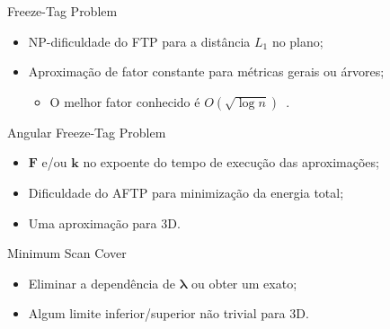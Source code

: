\subseqslide

\begin{frame}{Freeze-Tag Problem}
  \begin{itemize}[<+->]

    \item NP-dificuldade do FTP para a distância $L_1$ no plano;

    \item Aproximação de fator constante para métricas gerais ou árvores;

    \begin{itemize}[<+->]
        \item O melhor fator conhecido é $O(\sqrt{\log n})$~\cite{Kne05}.
    \end{itemize}

  \end{itemize}
\end{frame}

\begin{frame}{Angular Freeze-Tag Problem}
  \begin{itemize}[<+->]

    \item $\mathbf{F}$ e/ou $\mathbf{k}$ no expoente do tempo de execução das aproximações;

    \item Dificuldade do AFTP para minimização da energia total;

    \item Uma aproximação para 3D.

  \end{itemize}
\end{frame}

\begin{frame}{Minimum Scan Cover}
  \begin{itemize}[<+->]

    \item Eliminar a dependência de $\mathbf{\lambda}$ ou obter um \FPT exato;

    \item Algum limite inferior/superior não trivial para 3D.

  \end{itemize}
\end{frame}
